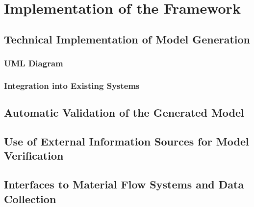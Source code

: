 \chapter{Implementation of the Framework}
\label{chap:implementation}

\section{Technical Implementation of Model Generation}
\subsection{UML Diagram}
\subsection{Integration into Existing Systems}

\section{Automatic Validation of the Generated Model}

\section{Use of External Information Sources for Model Verification}

\section{Interfaces to Material Flow Systems and Data Collection}
